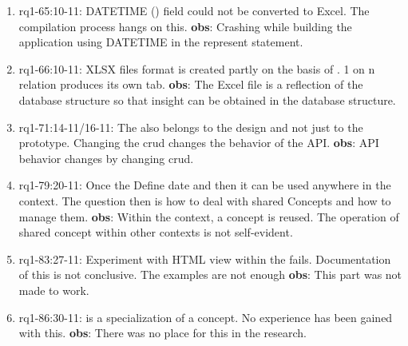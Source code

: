 \begin{enumerate}
    
    \item rq1-65:10-11: DATETIME () field could not be converted to Excel.
    The compilation process hangs on this.
    \newline\textbf{obs}: Crashing while building the application using DATETIME in the represent statement.
     
    \item rq1-66:10-11: XLSX files format is created partly on the basis of .
    1 on n relation produces its own tab.
    \newline\textbf{obs}: The Excel file is a reflection of the database structure so that insight can be obtained in the database structure.
     
    
    \item rq1-71:14-11/16-11: The  also belongs to the design and not just to the prototype.
    Changing the \acrlong{crud} changes the behavior of the API.
    \newline\textbf{obs}: API behavior changes by changing \acrshort{crud}.
     
    \item rq1-79:20-11: Once the  Define date and then it can be used anywhere in the context.
    The question then is how to deal with shared Concepts and how to manage them.
    \newline\textbf{obs}: Within the context, a concept is reused.
    The operation of shared concept within other contexts is not self-evident.
     
    \item rq1-83:27-11: Experiment with HTML view within the  fails.
    Documentation of this is not conclusive.
    The examples are not enough
    \newline\textbf{obs}: This part was not made to work.    
    
    \item rq1-86:30-11:  is a specialization of a concept.
    No experience has been gained with this.
    \newline\textbf{obs}: There was no place for this in the research.
     

\end{enumerate}
